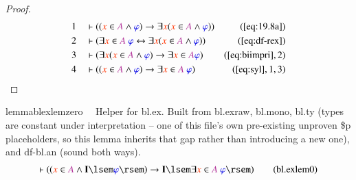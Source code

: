 \begin{proof}
\begin{align}
  1 &&  & \vdash ( ( \msc{x} \in \mc{A} \wedge \mw{\varphi} ) \rightarrow
      \exists \msc{x} ( \msc{x} \in \mc{A} \wedge \mw{\varphi} )
      )&(\mbox{\ref{eq:19.8a}})\notag
  \\ 2 &&  & \vdash ( \exists \msc{x} \in \mc{A}~\mw{\varphi}
      \leftrightarrow \exists \msc{x} ( \msc{x} \in \mc{A} \wedge
      \mw{\varphi} ) )&(\mbox{\ref{eq:df-rex}})\notag
  \\ 3 &&  & \vdash ( \exists \msc{x} ( \msc{x} \in \mc{A} \wedge
      \mw{\varphi} ) \rightarrow \exists \msc{x} \in \mc{A}
      \mw{\varphi} )&(\mbox{\ref{eq:biimpri}},2)\notag
  \\ 4 &&  & \vdash ( ( \msc{x} \in \mc{A} \wedge \mw{\varphi} )
      \rightarrow \exists \msc{x} \in \mc{A}~\mw{\varphi}
      )&(\mbox{\ref{eq:syl}},1,3)\notag
\end{align}
\end{proof}

\begin{restatable}{lemma}{blexlemzero}~~ Helper for bl.ex.  Built from bl.exraw,
bl.mono, bl.ty (types are constant under interpretation -- one of this
file's own pre-existing unproven \$p placeholders, so this lemma inherits
that gap rather than introducing a new one), and df-bl.an (sound both ways).
\begin{align}
\vdash ( ( \msc{x} \in \mc{A} \wedge \mathbf{I} \lsem \mw{\varphi} \rsem )
    \rightarrow \mathbf{I} \lsem \exists \msc{x} \in \mc{A}~\mw{\varphi} \rsem
    )\label{eq:bl.exlem0}\tag{bl.exlem0}
\end{align}
\end{restatable}

